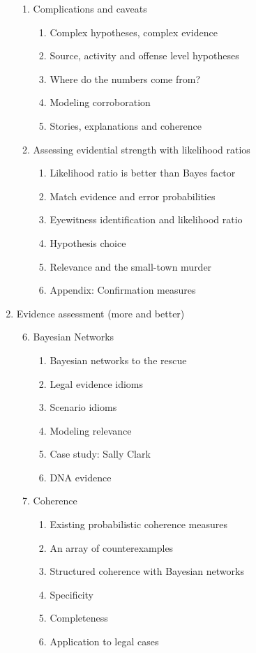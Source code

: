 \documentclass[
  10pt,
  dvipsnames,enabledeprecatedfontcommands]{scrartcl}
\begin{document}
\begin{multicols}{2}
\begin{enumerate}
\begin{enumerate}
  
  
  \item  Complications and caveats
  \begin{enumerate}
  \item  Complex hypotheses, complex evidence
  \item  Source, activity and offense level hypotheses
  \item  Where do the numbers come from?
  \item  Modeling corroboration
  \item  Stories, explanations and coherence
  \end{enumerate}

  
  \item  Assessing evidential strength with likelihood ratios
  \begin{enumerate}
  \item Likelihood ratio is better than Bayes factor
  \item Match evidence and error probabilities
  \item Eyewitness identification and likelihood ratio
  \item Hypothesis choice
  \item Relevance and the small-town murder 
  \item Appendix: Confirmation measures
   \end{enumerate}


\end{enumerate}
\item  Evidence assessment (more and better)
\begin{enumerate}

\setcounter{enumii}{5}
\item  Bayesian Networks

  \begin{enumerate}
  \item  Bayesian networks to the rescue
  \item  Legal evidence idioms
  \item Scenario idioms
  \item Modeling relevance
  \item  Case study: Sally Clark
  \item DNA evidence
  \end{enumerate}
  
   \item Coherence
  \begin{enumerate}
  \item Existing probabilistic coherence measures
  \item An array of counterexamples
  \item Structured coherence with Bayesian networks
  \item Specificity
  \item Completeness 
  \item Application to legal cases
  \end{enumerate}
  

\end{enumerate}
\end{enumerate}
\end{multicols}
\end{document}
